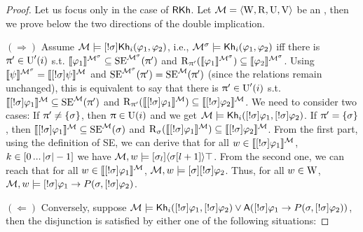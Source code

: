 \begin{proof}

Let us focus only in the case of $\axm{RKh}$.  
Let $\modults = \tup{\W, \R, \Unc, \V}$ be an \ults, then we prove below the two directions of the double implication.

$(\Rightarrow)$ Assume $\modults \models \srefbox{\plan} \khi(\varphi_1,\varphi_2)$, i.e.,  $\modults^\plan \models \khi(\varphi_1,\varphi_2)$ iff there is $\plans' \in \Unc'(i)$ s.t. $\truthset{\modults^\plan}{\varphi_1} \subseteq \stexec^{\modults^\plan}(\plans')$ and $\R_{\plans'}(\truthset{\modults^\plan}{\varphi_1}) \subseteq \truthset{\modults^\plan}{\varphi_2}$.
Using $\truthset{\modults^\plan}{\psi} = \truthset{\modults}{\srefbox{\plan} \psi}$ and $\stexec^{\modults^\plan}(\plans') = \stexec^\modults(\plans')$ (since the relations remain unchanged), this is equivalent to say that there is $\plans' \in \Unc'(i)$ s.t. $\truthset{\modults}{\srefbox{\plan} \varphi_1} \subseteq \stexec^\modults(\plans')$ and $\R_{\plans'}(\truthset{\modults}{\srefbox{\plan} \varphi_1}) \subseteq \truthset{\modults}{\srefbox{\plan} \varphi_2}$. We need to consider two cases:
If $\plans' \neq \set{\plan}$, then $\plans \in \Unc(i)$ and we get $\modults \models \khi(\srefbox{\plan}\varphi_1,\srefbox{\plan}\varphi_2)$.
If $\plans' = \set{\plan}$, then $\truthset{\modults}{\srefbox{\plan}\varphi_1} \subseteq \stexec^\modults(\plan)$ and $\R_\plan(\truthset{\modults}{\srefbox{\plan}\varphi_1}) \subseteq \truthset{\modults}{\srefbox{\plan}\varphi_2}$.
From the first part, using the definition of SE, we can derive that for all $w \in \truthset{\modults}{\srefbox{\plan}\varphi_1}$, $k \in \intint{0}{\card{\plan}-1}$ we have $\modults,w \models \mlbox{\plan_l}\mldiam{\plan[l+1]}\top$.
From the second one, we can reach that for all $w \in \truthset{\modults}{\srefbox{\plan}\varphi_1}$, $\modults,w \models \mlbox{\plan} \srefbox{\plan}\varphi_2$.
Thus, for all $w \in \W$, $\modults,w \models \srefbox{\plan} \varphi_1 \ra P(\plan,\srefbox{\plan}\varphi_2)$.

$(\Leftarrow)$ Conversely, suppose $\modults \models \khi(\srefbox{\plan} \varphi_1,\srefbox{\plan} \varphi_2) \vee \A(\srefbox{\plan} \varphi_1 \ra P(\plan,\srefbox{\plan}\varphi_2))$, then the disjunction is satisfied by either one of the following situations:


\end{proof}

